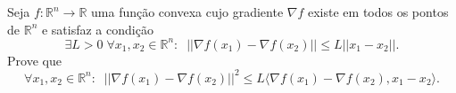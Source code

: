 Seja \(f\colon \mathbb{R}^{n}\to \mathbb{R}\) uma função convexa cujo gradiente \(\nabla f\) existe em todos os pontos de \(\mathbb{R}^{n}\) e satisfaz a condição
\[\exists L>0\; \forall x_{1},x_{2}\in \mathbb{R}^{n}:\;\; ||\nabla f(x_{1})-\nabla f(x_{2})||\leq L||x_{1}-x_{2}||.\] Prove que
\[ \forall x_{1},x_{2}\in \mathbb{R}^{n}:\;\; ||\nabla f(x_{1})-\nabla f(x_{2})||^{2}\leq L\langle\nabla f(x_{1})-\nabla f(x_{2}), x_{1}-x_{2}\rangle. \]
